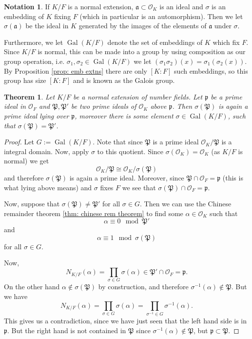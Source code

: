 \documentclass[11pt,a4paper]{report}
\theoremstyle{plain}
\newtheorem{theorem}[subsection]{Theorem}
\theoremstyle{definition}
\theoremstyle{definition}
\newtheorem{nota}[subsection]{Notation}
\def \gothP{\mathfrak{P}}
\def\gothp{\mathfrak{p}}
\def \a{\alpha}
\def \s {\sigma}
\def \OO {\mathcal{O}}
\def \s {\sigma}
\def\gotha{\mathfrak{a}}
\DeclareMathOperator{\Gal}{Gal}
\begin{document}
	\begin{nota}
		If $K/F$ is a normal extension, $\gotha \subset \OO_K$ is an ideal and $\s$ is an embedding of $K$ fixing $F$ (which in particular is an automorphism). Then we let $\s(\gotha)$ be the ideal in $K$ generated by the images of the elements of $\gotha$ under $\s$. 
		
		Furthermore, we let $\Gal(K/F)$ denote the set of embeddings of $K$ which fix $F$. Since $K/F$ is normal, this can be made into a group by using composition as our group operation, i.e. $\s_1,\s_2 \in \Gal(K/F)$ we let $(\s_1 \s_2)(x)= \s_1(\s_2(x))$. By  Proposition \ref{prop: emb extns} there are only $[K:F]$ such embeddings, so this group has size $[K:F]$ and is known as the Galois group.
	\end{nota}
	
	
	
	
	
	\begin{theorem}\label{thm: ideals and embs}
		Let $K/F$ be a normal extension of number fields. Let $\gothp$ be a prime ideal in $\OO_F$ and $\gothP,\gothP'$ be two prime ideals of $\OO_K$ above $\gothp$. Then $\s(\gothP)$ is again a prime ideal lying over $\gothp$, moreover there is some element $\s \in \Gal(K/F)$, such that $\s(\gothP)=\gothP'$.
	\end{theorem}
	
	\begin{proof}
		Let $G:=\Gal(K/F)$. Note that since $\gothP$ is a prime ideal $\OO_K/\gothP$ is a integral domain. Now, apply $\s$ to this quotient. Since $\s(\OO_K)=\OO_K$ (as $K/F$ is normal) we get \[\OO_K/\gothP \cong \OO_K /\s(\gothP)\] and therefore $\s(\gothP)$ is again a prime ideal. Moreover, since $\gothP \cap \OO_F=\gothp$ (this is what lying above means) and $\s$ fixes $F$ we see that $\s(\gothP) \cap \OO_F=\gothp$. 
		
		
		Now, suppose that $\s(\gothP) \neq \gothP'$ for all $\s \in G$. Then we can use the Chinese remainder theorem \ref{thm: chinese rem theorem} to find some $\a \in \OO_K$ such that \[\a \equiv 0 \mod \gothP'\] and \[\a \equiv 1 \mod \s(\gothP)\] for all $\s \in G$.
		
		Now, \[N_{K/F}(\a)=\prod_{\s \in G} \s(\a) \in \gothP' \cap \OO_F=\gothp.\] On the other hand $\a \not \in \s(\gothP)$ by construction, and therefore $\s^{-1}(\a) \not \in \gothP$. But we have \[N_{K/F}(\a)=\prod_{\s \in G} \s(\a)=\prod_{\s^{-1} \in G} \s^{-1}(\a).\] This gives us a contradiction, since we have just seen that the left hand side is in $\gothp$. But the right hand  is not contained in $\gothP$ since  $\s^{-1}(\a) \not \in \gothP$, but $\gothp \subset \gothP$. 
		
		
	\end{proof}
	
\end{document}
